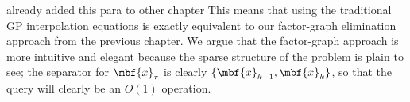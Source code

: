 \alert{already added this para to other chapter}
This means that using the traditional \ac{GP} interpolation equations is exactly equivalent to our factor-graph elimination approach from the previous chapter.  We argue that the factor-graph approach is more intuitive and elegant because the sparse structure of the problem is plain to see; the separator for $\mbf{x}_\tau$ is clearly $\{ \mbf{x}_{k-1}, \mbf{x}_k\}$, so that the query will clearly be an $O(1)$ operation. 

